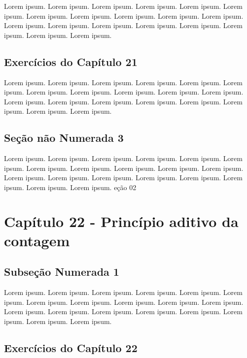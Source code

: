 \documentclass[
]{book}
\begin{document}
Lorem ipsum. Lorem ipsum. Lorem ipsum. Lorem ipsum. Lorem ipsum. Lorem ipsum. Lorem ipsum. Lorem ipsum. Lorem ipsum. Lorem ipsum. Lorem ipsum. Lorem ipsum. Lorem ipsum. Lorem ipsum. Lorem ipsum. Lorem ipsum. Lorem ipsum. Lorem ipsum. Lorem ipsum.

\hypertarget{exercuxedcios-do-capuxedtulo-21-1}{%
\subsection{Exercícios do Capítulo 21}\label{exercuxedcios-do-capuxedtulo-21-1}}

Lorem ipsum. Lorem ipsum. Lorem ipsum. Lorem ipsum. Lorem ipsum. Lorem ipsum. Lorem ipsum. Lorem ipsum. Lorem ipsum. Lorem ipsum. Lorem ipsum. Lorem ipsum. Lorem ipsum. Lorem ipsum. Lorem ipsum. Lorem ipsum. Lorem ipsum. Lorem ipsum. Lorem ipsum.

\hypertarget{seuxe7uxe3o-nuxe3o-numerada-3-5}{%
\subsection*{Seção não Numerada 3}\label{seuxe7uxe3o-nuxe3o-numerada-3-5}}

Lorem ipsum. Lorem ipsum. Lorem ipsum. Lorem ipsum. Lorem ipsum. Lorem ipsum. Lorem ipsum. Lorem ipsum. Lorem ipsum. Lorem ipsum. Lorem ipsum. Lorem ipsum. Lorem ipsum. Lorem ipsum. Lorem ipsum. Lorem ipsum. Lorem ipsum. Lorem ipsum. Lorem ipsum.
eção 02

\hypertarget{capuxedtulo-22---princuxedpio-aditivo-da-contagem-2}{%
\section{Capítulo 22 - Princípio aditivo da contagem}\label{capuxedtulo-22---princuxedpio-aditivo-da-contagem-2}}

\hypertarget{subseuxe7uxe3o-numerada-1-6}{%
\subsection{Subseção Numerada 1}\label{subseuxe7uxe3o-numerada-1-6}}

Lorem ipsum. Lorem ipsum. Lorem ipsum. Lorem ipsum. Lorem ipsum. Lorem ipsum. Lorem ipsum. Lorem ipsum. Lorem ipsum. Lorem ipsum. Lorem ipsum. Lorem ipsum. Lorem ipsum. Lorem ipsum. Lorem ipsum. Lorem ipsum. Lorem ipsum. Lorem ipsum. Lorem ipsum.

\hypertarget{exercuxedcios-do-capuxedtulo-22-2}{%
\subsection{Exercícios do Capítulo 22}\label{exercuxedcios-do-capuxedtulo-22-2}}
\end{document}
